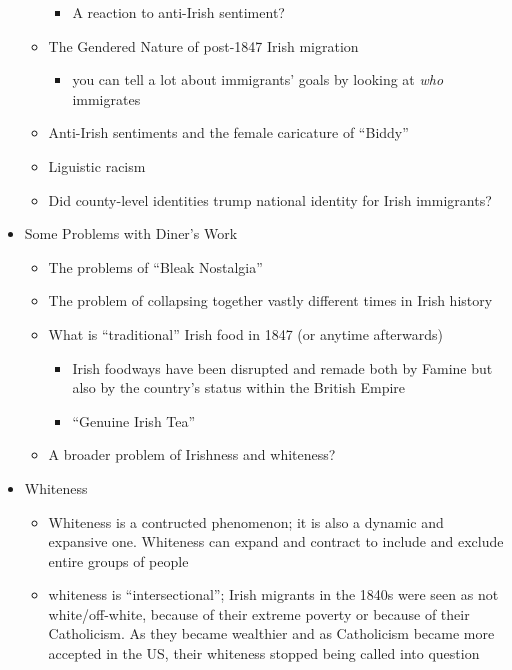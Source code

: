 \documentclass[12pt]{article}
\begin{document}
\begin{itemize}
\begin{itemize}
\begin{itemize}
                        \item A reaction to anti-Irish sentiment?
                    \end{itemize}
                    \item The Gendered Nature of post-1847 Irish migration
                    \begin{itemize}
                        \item you can tell a lot about immigrants' goals by looking at \textit{who} immigrates
                    \end{itemize}
                    \item Anti-Irish sentiments and the female caricature of ``Biddy''
                    \item Liguistic racism
                    \item Did county-level identities trump national identity for Irish immigrants?
                \end{itemize}
                \item Some Problems with Diner's Work
                \begin{itemize}
                    \item The problems of ``Bleak Nostalgia''
                    \item The problem of collapsing together vastly different times in Irish history
                    \item What is ``traditional'' Irish food in 1847 (or anytime afterwards)
                    \begin{itemize}
                        \item Irish foodways have been disrupted and remade both by Famine but also by the country's status within the British Empire
                        \item ``Genuine Irish Tea''
                    \end{itemize}
                    \item A broader problem of Irishness and whiteness?
                \end{itemize}
                \item Whiteness
                \begin{itemize}
                    \item Whiteness is a contructed phenomenon; it is also a dynamic and expansive one. Whiteness can expand and contract to include and exclude entire groups of people
                    \item whiteness is ``intersectional''; Irish migrants in the 1840s were seen as not white/off-white, because of their extreme poverty or because of their Catholicism. As they became wealthier and as Catholicism became more accepted in the US, their whiteness stopped being called into question

\end{itemize}
\end{itemize}
\end{document}

